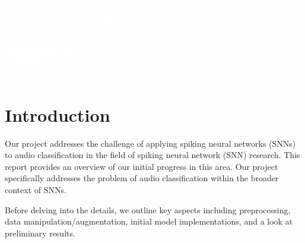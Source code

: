 \documentclass[11pt]{article}
\begin{document}
\pagecolor{darkbluegrey}
\afterpage{\nopagecolor}


\begin{titlepage}
  \begin{center}
    \textcolor{white}{\textbf{\Huge First Report}}\\ %
    \vspace{1cm}
    \textcolor{white}{\Large Sound Detection and Classification\\using Spiking Neural Networks} %
    \vspace{3cm}
  \end{center}
  \begin{center}
    \textcolor{white}{ %
      \textbf{COURREGE Téo}\\
      \textbf{GANDEEL Lo'aï}\\
      \vspace{1cm}
      \Large Date: \today}
  \end{center}
\end{titlepage}

\newpage

\tableofcontents

\pagebreak

\listoffigures

\pagebreak

\section{Introduction}

Our project addresses the challenge of applying spiking neural networks (SNNs) to audio classification in the field of spiking neural network (SNN) research. This report provides an overview of our initial progress in this area. Our project specifically addresses the problem of audio classification within the broader context of SNNs.

Before delving into the details, we outline key aspects including preprocessing, data manipulation/augmentation, initial model implementations, and a look at preliminary results.
\end{document}
